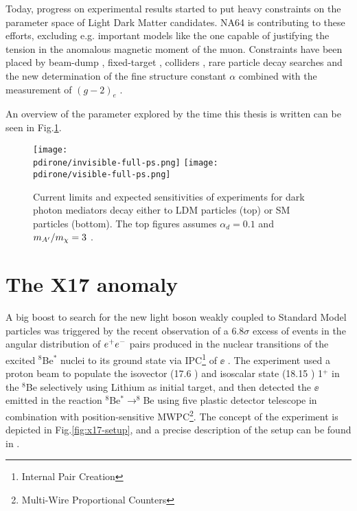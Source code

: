 Today, progress on experimental results started to put heavy constraints on the parameter space of Light Dark Matter candidates. NA64 is contributing to these efforts, excluding e.g. important models like the one capable of justifying the tension in the anomalous magnetic moment of the muon. Constraints have been placed by beam-dump \cite{jdb, charm, PhysRevLett.59.755, e137, konaka, PhysRevLett.67.2942, dav,  ath, nomad, e787, essig1, blum,sg1, blum1, sarah1}, fixed-target \cite{apex,merkel,merkel1}, colliders \cite{babar, curt, babar1}, rare particle decay searches \cite{sindrum, kloe, sg2, kloe2, wasa, hades, phenix, e949, na48, pol, kloe3} and the new determination of the fine structure constant $\alpha$ combined with the measurement of $(g-2)_e$ \cite{Parker191,PhysRevLett.100.120801}.

An overview of the parameter explored by the time this thesis is written can be seen in Fig.\ref{fig:dmplane-overview}.

\begin{figure}[bth!]
  \centering
  \texttt{[image: \\pdirone/invisible-full-ps.png]}
  \texttt{[image: \\pdirone/visible-full-ps.png]}
  \caption[Current exclusion limit and project for Dark Photon in the physics community]{Current limits and expected sensitivities of experiments for dark photon mediators decay either to LDM particles (top) or SM particles (bottom). The top figures assumes $\alpha_d = 0.1$ and $m_{A'}/m_{\chi} = 3$ \cite{pbc-book}.}
  \label{fig:dmplane-overview}
\end{figure}  

\section{The X17 anomaly}
\label{ch1:sec:dm-u1model-motivations-x17}

A big boost to search for the new light boson weakly coupled to Standard Model particles was triggered by the recent observation of a 6.8$\sigma$ excess of events in the angular distribution of $e^+e^-$ pairs produced in the nuclear transitions of the excited $^8$Be$^*$ nuclei to its ground state via IPC\footnote{Internal Pair Creation} of $\ee$ \cite{Krasznahorkay:2015iga}. The experiment used a proton beam to populate the isovector (17.6 \mev) and isoscalar state (18.15 \mev) 1$^+$ in the $^8$Be selectively using Lithium as initial target, and then detected the $\ee$ emitted in the reaction $^8$Be$^* \to ^8$Be using five plastic detector telescope in combination with position-sensitive MWPC\footnote{Multi-Wire Proportional Counters}. The concept of the experiment is depicted in Fig.\ref{fig:x17-setup}, and a precise description of the setup can be found in \cite{GULYAS201621}.

